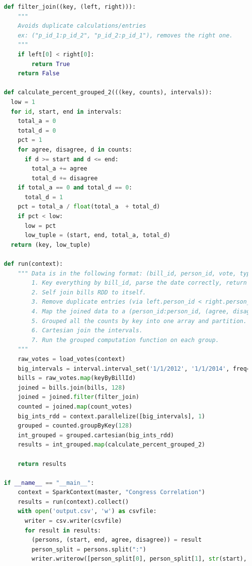 \documentclass[11pt]{article}
\begin{document}
\begin{lstlisting}[language=Python]
def filter_join((key, (left, right))):
    """
    Avoids duplicate calculations/entries
    ex: ("p_id_1:p_id_2", "p_id_2:p_id_1"), removes the right one.
    """
    if left[0] < right[0]:
        return True
    return False

def calculate_percent_grouped_2(((key, counts), intervals)):
  low = 1
  for id, start, end in intervals:
    total_a = 0
    total_d = 0
    pct = 1
    for agree, disagree, d in counts:
      if d >= start and d <= end:
        total_a += agree
        total_d += disagree
    if total_a == 0 and total_d == 0:
      total_d = 1
    pct = total_a / float(total_a  + total_d)
    if pct < low:
      low = pct
      low_tuple = (start, end, total_a, total_d)
  return (key, low_tuple)

def run(context):
    """ Data is in the following format: (bill_id, person_id, vote, type, chamber, year, date, session, status, extra).
        1. Key everything by bill_id, parse the date correctly, return (bill_id, (person_id, vote, date))
        2. Self join bills RDD to itself.
        3. Remove duplicate entries (via left.person_id < right.person_id) and comparisons with self.
        4. Map the joined data to a (person_id:person_id, (agree, disagree)) RDD.
        5. Grouped all the counts by key into one array and partition. 
        6. Cartesian join the intervals.
        7. Run the grouped computation function on each group. 
    """
    raw_votes = load_votes(context)
    big_intervals = interval.interval_set('1/1/2012', '1/1/2014', freq='15D', max_delta=pandas.Timedelta(days=120))
    bills = raw_votes.map(keyByBillId)
    joined = bills.join(bills, 128)
    joined = joined.filter(filter_join)
    counted = joined.map(count_votes)
    big_ints_rdd = context.parallelize([big_intervals], 1)
    grouped = counted.groupByKey(128)
    int_grouped = grouped.cartesian(big_ints_rdd)
    results = int_grouped.map(calculate_percent_grouped_2)

    return results

if __name__ == "__main__":
    context = SparkContext(master, "Congress Correlation")
    results = run(context).collect()
    with open('output.csv', 'w') as csvfile:
      writer = csv.writer(csvfile)
      for result in results:
        (persons, (start, end, agree, disagree)) = result
        person_split = persons.split(":")
        writer.writerow([person_split[0], person_split[1], str(start), str(end), str(agree), str(disagree), str((agree / (agree + disagree)))])
\end{lstlisting}
\end{document}
